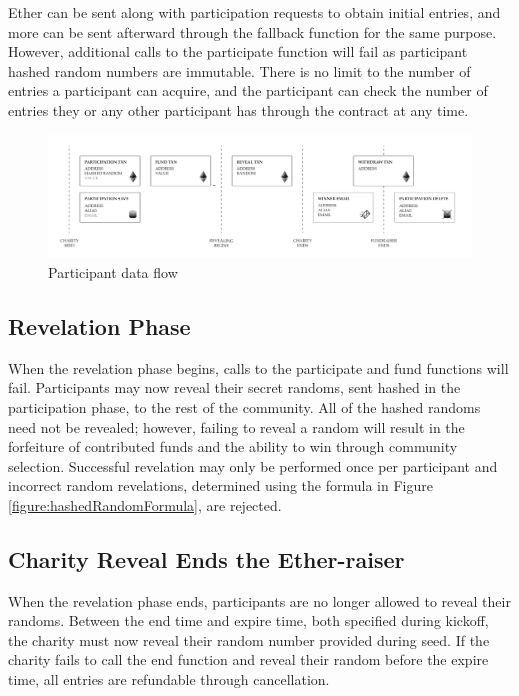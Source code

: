 \documentclass[11pt]{article}
\begin{document}
Ether can be sent along with participation requests to obtain initial entries, and more can be sent afterward through the fallback function for the same purpose. However, additional calls to the participate function will fail as participant hashed random numbers are immutable. There is no limit to the number of entries a participant can acquire, and the participant can check the number of entries they or any other participant has through the contract at any time.

\begin{figure}[H]
\begin{center}
\includegraphics[width=1.0\textwidth]{./graphics/participantDataFlow.pdf}
\caption{Participant data flow}
\label{figure:participantDataFlow}
\end{center}
\end{figure}

\subsection{Revelation Phase}

When the revelation phase begins, calls to the participate and fund functions will fail. Participants may now reveal their secret randoms, sent hashed in the participation phase, to the rest of the community. All of the hashed randoms need not be revealed; however, failing to reveal a random will result in the forfeiture of contributed funds and the ability to win through community selection. Successful revelation may only be performed once per participant and incorrect random revelations, determined using the formula in Figure \ref{figure:hashedRandomFormula}, are rejected.

\subsection{Charity Reveal Ends the Ether-raiser}

When the revelation phase ends, participants are no longer allowed to reveal their randoms. Between the end time and expire time, both specified during kickoff, the charity must now reveal their random number provided during seed. If the charity fails to call the end function and reveal their random before the expire time, all entries are refundable through cancellation.
\end{document}
